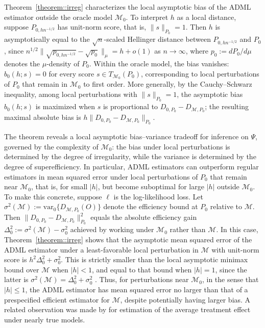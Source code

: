 \documentclass[11pt]{article}
\theoremstyle{definition}
\begin{document}
 


Theorem~\ref{theorem::irreg} characterizes the local asymptotic bias of the ADML estimator outside the oracle model \(\mathcal{M}_0\). To interpret \(h\) as a local distance, suppose \(P_{0,hn^{-1/2}}\) has unit-norm score, that is, \(\|s\|_{P_0}=1\). Then \(h\) is asymptotically equal to the \(\sqrt{n}\)-scaled Hellinger distance between \(P_{0,hn^{-1/2}}\) and \(P_0\), since $n^{1/2}\|\sqrt{p_{0,hn^{-1/2}}}-\sqrt{p_0}\|_{\mu}
=
h+o(1)$
as \(n\to\infty\), where \(p_0 := dP_0/d\mu\) denotes the \(\mu\)-density of \(P_0\). Within the oracle model, the bias vanishes: \(b_0(h;s)=0\) for every score \(s \in T_{\mathcal{M}_0}(P_0)\), corresponding to local perturbations of \(P_0\) that remain in \(\mathcal{M}_0\) to first order. More generally, by the Cauchy--Schwarz inequality, among local perturbations with \(\|s\|_{P_0}=1\), the asymptotic bias \(b_0(h;s)\) is maximized when \(s\) is proportional to \(D_{0,P_0}-D_{\mathcal{M},P_0}\); the resulting maximal absolute bias is \(h\|D_{0,P_0}-D_{\mathcal{M},P_0}\|_{P_0}\).

 


The theorem reveals a local asymptotic bias--variance tradeoff for inference on \(\Psi\), governed by the complexity of \(\mathcal{M}_0\): the bias under local perturbations is determined by the degree of irregularity, while the variance is determined by the degree of superefficiency. In particular, ADML estimators can outperform regular estimators in mean squared error under local perturbations of \(P_0\) that remain near \(\mathcal{M}_0\), that is, for small \(|h|\), but become suboptimal for large \(|h|\) outside \(\mathcal{M}_0\). To make this concrete, suppose \(\ell\) is the log-likelihood loss. Let \(\sigma^2(\mathcal{M}) := \mathrm{var}_0\{D_{\mathcal{M},P_0}(O)\}\) denote the efficiency bound at \(P_0\) relative to \(\mathcal{M}\). Then \(\|D_{0,P_0} - D_{\mathcal{M},P_0}\|_{P_0}^2\) equals the absolute efficiency gain \(\Delta_0^2 := \sigma^2(\mathcal{M}) - \sigma_0^2\) achieved by working under \(\mathcal{M}_0\) rather than \(\mathcal{M}\). In this case, Theorem~\ref{theorem::irreg} shows that the asymptotic mean squared error of the ADML estimator under a least-favorable local perturbation in \(\mathcal{M}\) with unit-norm score is \(h^2\Delta_0^2 + \sigma_0^2\). This is strictly smaller than the local asymptotic minimax bound over \(\mathcal{M}\) when \(|h|<1\), and equal to that bound when \(|h|=1\), since the latter is \(\sigma^2(\mathcal{M}) = \Delta_0^2 + \sigma_0^2\) \citep{hajek1972local}. Thus, for perturbations near \(\mathcal{M}_0\), in the sense that \(|h|\leq 1\), the ADML estimator has mean squared error no larger than that of a prespecified efficient estimator for \(\mathcal{M}\), despite potentially having larger bias. A related observation was made by \cite{lumley2017robustness} for estimation of the average treatment effect under nearly true models.
\end{document}

